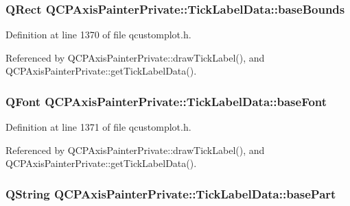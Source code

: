 \subsubsection[{base\+Bounds}]{\setlength{\rightskip}{0pt plus 5cm}Q\+Rect Q\+C\+P\+Axis\+Painter\+Private\+::\+Tick\+Label\+Data\+::base\+Bounds}\label{struct_q_c_p_axis_painter_private_1_1_tick_label_data_aac1047ae6ab8e9f5a42923082aabfff5}


Definition at line 1370 of file qcustomplot.\+h.



Referenced by Q\+C\+P\+Axis\+Painter\+Private\+::draw\+Tick\+Label(), and Q\+C\+P\+Axis\+Painter\+Private\+::get\+Tick\+Label\+Data().

\hypertarget{struct_q_c_p_axis_painter_private_1_1_tick_label_data_a0d4958a706debaa8d19a9b65fc090d56}{}
\subsubsection[{base\+Font}]{\setlength{\rightskip}{0pt plus 5cm}Q\+Font Q\+C\+P\+Axis\+Painter\+Private\+::\+Tick\+Label\+Data\+::base\+Font}\label{struct_q_c_p_axis_painter_private_1_1_tick_label_data_a0d4958a706debaa8d19a9b65fc090d56}


Definition at line 1371 of file qcustomplot.\+h.



Referenced by Q\+C\+P\+Axis\+Painter\+Private\+::draw\+Tick\+Label(), and Q\+C\+P\+Axis\+Painter\+Private\+::get\+Tick\+Label\+Data().

\hypertarget{struct_q_c_p_axis_painter_private_1_1_tick_label_data_ad65b76a5cafc412179a20b5d79809fc4}{}
\subsubsection[{base\+Part}]{\setlength{\rightskip}{0pt plus 5cm}Q\+String Q\+C\+P\+Axis\+Painter\+Private\+::\+Tick\+Label\+Data\+::base\+Part}\label{struct_q_c_p_axis_painter_private_1_1_tick_label_data_ad65b76a5cafc412179a20b5d79809fc4}


